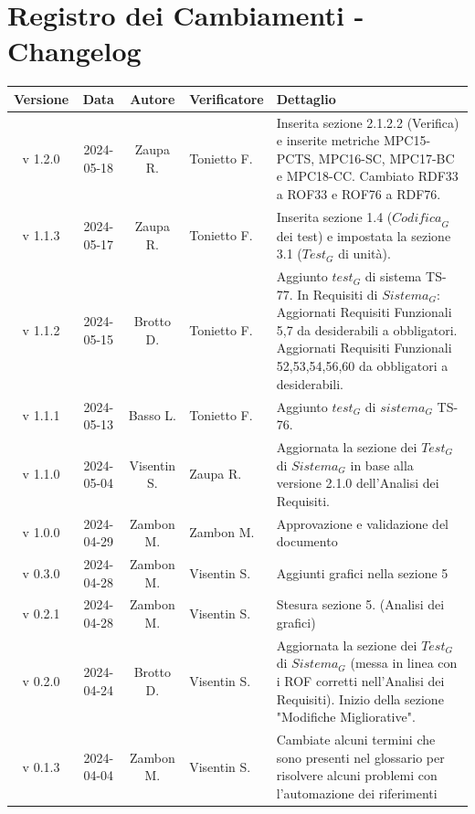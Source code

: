 \documentclass[12pt, oneside]{article}
\begin{document}
\section*{Registro dei Cambiamenti - Changelog}
\begin{longtable}{|c|c|c|p{3cm}|p{6cm}|}
\hline
\textbf{Versione} & \textbf{Data} & \textbf{Autore} & \textbf{Verificatore} & \textbf{Dettaglio} \\
\hline
v 1.2.0 & 2024-05-18 & Zaupa R. & Tonietto F. & Inserita sezione 2.1.2.2 (Verifica) e inserite metriche MPC15-PCTS, MPC16-SC, MPC17-BC e MPC18-CC. Cambiato RDF33 a ROF33 e ROF76 a RDF76.\\
\hline
v 1.1.3 & 2024-05-17 & Zaupa R. & Tonietto F. & Inserita sezione 1.4 ($\textit{Codifica}_G$ dei test) e impostata la sezione 3.1 ($\textit{Test}_G$ di unità). \\
\hline
v 1.1.2 & 2024-05-15 & Brotto D. & Tonietto F. & Aggiunto $\textit{test}_G$ di sistema TS-77. \newline In Requisiti di $\textit{Sistema}_G$: \newline Aggiornati Requisiti Funzionali 5,7 da desiderabili a obbligatori. \newline Aggiornati Requisiti Funzionali 52,53,54,56,60 da obbligatori a desiderabili.\\
\hline
v 1.1.1 & 2024-05-13 & Basso L. & Tonietto F. & Aggiunto $\textit{test}_G$ di $\textit{sistema}_G$ TS-76.\\
\hline
v 1.1.0 & 2024-05-04 & Visentin S. & Zaupa R. & Aggiornata la sezione dei $\textit{Test}_G$ di $\textit{Sistema}_G$ in base alla versione 2.1.0 dell'Analisi dei Requisiti.\\
\hline
v 1.0.0 & 2024-04-29 & Zambon M. & Zambon M. & Approvazione e validazione del documento\\
\hline
v 0.3.0 & 2024-04-28 & Zambon M. & Visentin S. & Aggiunti grafici nella sezione 5\\
\hline
v 0.2.1 & 2024-04-28 & Zambon M. & Visentin S. & Stesura sezione 5. (Analisi dei grafici)\\
\hline
v 0.2.0 & 2024-04-24 & Brotto D. & Visentin S. & Aggiornata la sezione dei $\textit{Test}_G$ di $\textit{Sistema}_G$ (messa in linea con i ROF corretti nell'Analisi dei Requisiti).
\newline
Inizio della sezione "Modifiche Migliorative".\\
\hline
v 0.1.3 & 2024-04-04 & Zambon M. & Visentin S. & Cambiate alcuni termini che sono presenti nel glossario per risolvere alcuni problemi con l'automazione dei riferimenti\\

\end{longtable}
\end{document}
